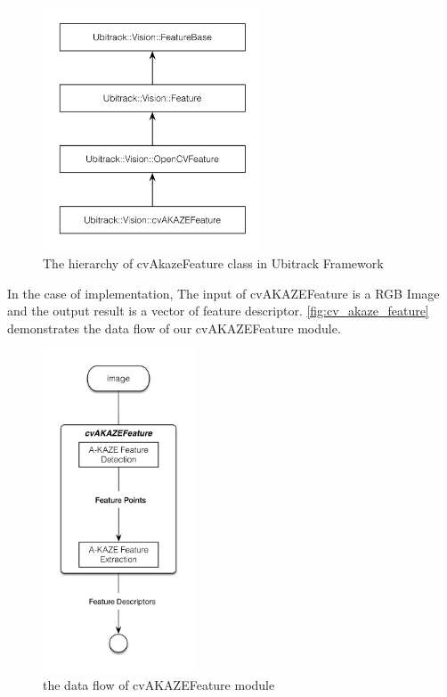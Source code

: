 \begin{figure}[H]
  \centering
  \includegraphics[width=65mm]{figures/cv_akaze}
  \caption{The hierarchy of cvAkazeFeature class in Ubitrack Framework}\label{fig:cv_akaze}
\end{figure}

In the case of implementation, The input of cvAKAZEFeature is a RGB Image and the output result is a vector of feature descriptor. \autoref{fig:cv_akaze_feature} demonstrates the data flow of our cvAKAZEFeature module.

\begin{figure}[H]
  \centering
  \includegraphics[width=45mm]{figures/cv_akaze_feature}
  \caption{the data flow of cvAKAZEFeature module}\label{fig:cv_akaze_feature}
\end{figure}
